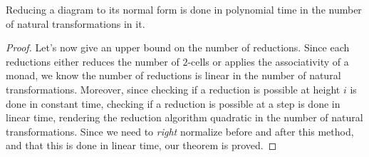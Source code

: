 \begin{theorem}
	\label{thm:normalize}
	Reducing a diagram to its normal form is done in polynomial time in
	the number of natural transformations in it.
\end{theorem}
\begin{proof}
	Let's now give an upper bound on the number of reductions.
	Since each reductions either reduces the number of $2$-cells or applies the
	associativity of a monad, we know the number of reductions is linear in the
	number of natural transformations.
	Moreover, since checking if a reduction is possible at height $i$ is done in
	constant time, checking if a reduction is possible at a step is done in
	linear time, rendering the reduction algorithm quadratic in the number of
	natural transformations.
	Since we need to \emph{right} normalize before and after this method, and
	that this is done in linear time, our theorem is proved.
\end{proof}

